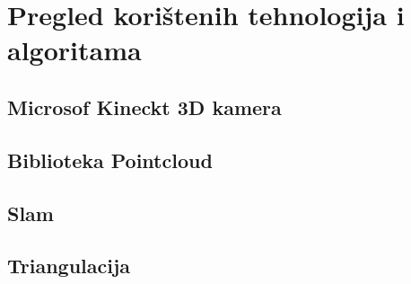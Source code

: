 \newpage

\section{Pregled korištenih tehnologija i algoritama} %
\label{sec:Tehnologija i teorija}


\subsection{Microsof Kineckt 3D kamera} %
\label{sub:Microsof Kineckt 3D kamera}


\subsection{Biblioteka Pointcloud} %
\label{sub:Biblioteka Pointcloud}



\subsection{Slam} %
\label{sub:Slam}


\subsection{Triangulacija} %
\label{sub:Triangulacija}



